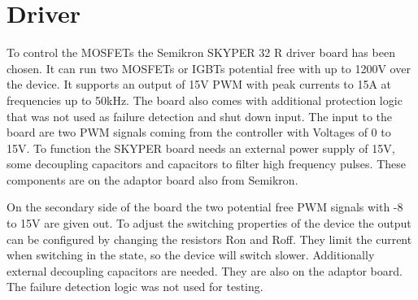 \section{Driver}\label{sec:driver}

To control the MOSFETs the Semikron SKYPER 32 R driver board has been chosen.
It can run two MOSFETs or IGBTs potential free with up to 1200V over the device.
It supports an output of 15V PWM with peak currents to 15A at frequencies up to 50kHz.
The board also comes with additional protection logic that was not used as failure detection and shut down input.
The input to the board are two PWM signals coming from the controller with Voltages of 0 to 15V.
To function the SKYPER board needs an external power supply of 15V,
some decoupling capacitors and capacitors to filter high frequency pulses.
These components are on the adaptor board also from Semikron.


On the secondary side of the board the two potential free PWM signals with -8 to 15V are given out.
To adjust the switching properties of the device the output can be configured by changing the resistors Ron and Roff.
They limit the current when switching in the state, so the device will switch slower.
Additionally external decoupling capacitors are needed. They are also on the adaptor board.
The failure detection logic was not used for testing.

